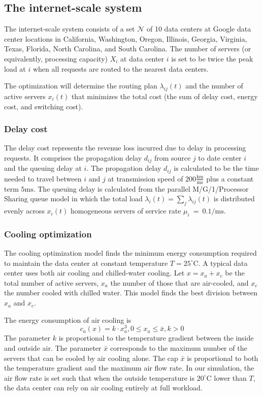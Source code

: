 \documentclass{acm_proc_article-sp}
\begin{document}
\subsection{The internet-scale system}
The internet-scale system consists of a set $\mathcal{N}$ of 10 data centers at Google data center locations in California, Washington, Oregon, Illinois, Georgia, Virginia, Texas, Florida, North Carolina, and South Carolina. The number of servers (or equivalently, processing capacity) $X_i$ at data center $i$ is set to be twice the peak load at $i$ when all requests are routed to the nearest data centers.

The optimization will determine the routing plan $\lambda_{ij}(t)$ and the number of active servers $x_i(t)$ that minimizes the total cost (the sum of delay cost, energy cost, and switching cost).

\subsubsection{Delay cost}
The delay cost represents the revenue loss incurred due to delay in processing requests. It comprises the propagation delay $d_{ij}$ from source $j$ to date center $i$ and the queuing delay at $i$.
The propagation delay $d_{ij}$ is calculated to be the time needed to travel between $i$ and $j$ at transmission speed of $200 \frac{\mathrm{km}}{\mathrm{ms}}$ plus a constant term $5 \mathrm{ms}$. The queuing delay is calculated from the parallel M/G/1/Processor Sharing queue model in which the total load $\lambda_i(t)=\sum_j \lambda_{ij}(t)$ is distributed evenly across $x_i(t)$ homogeneous servers of service rate \mbox{$\mu_i$ = $0.1 / \mathrm{ms}$}.

\subsubsection{Cooling optimization}
The cooling optimization model finds the minimum energy consumption required to maintain the data center at constant temperature $T = 25^{\circ}\textrm{C}$. A typical data center uses both air cooling and chilled-water cooling. Let $x = x_a + x_c$ be the total number of active servers, $x_a$ the number of those that are air-cooled, and $x_c$ the number cooled with chilled water. This model finds the best division between $x_a$ and $x_c$.

The energy consumption of air cooling is
\begin{equation}
c_a(x) = k \cdot x_a^3, 0 \leq x_a \leq \bar{x}, k > 0
\end{equation}
The parameter $k$ is proportional to the temperature gradient between the inside and outside air. The parameter $\bar{x}$ corresponds to the maximum number of the servers that can be cooled by air cooling alone. The cap $\bar{x}$ is proportional to both the temperature gradient and the maximum air flow rate. In our simulation, the air flow rate is set such that when the outside temperature is $20^{\circ}\mathrm{C}$ lower than $T$, the data center can rely on air cooling entirely at full workload.
\end{document}
